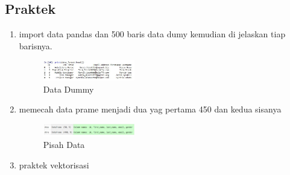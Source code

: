     \subsection{Praktek}
    \begin{enumerate}
        \item import data pandas dan 500 baris data dumy kemudian di jelaskan tiap barisnya. 
\hfill \break 
        
        \begin{figure}[H]
            \includegraphics[width=4cm]{figures/1174003/4/1.jpg}
            \centering
            \caption{Data Dummy}
        \end{figure}

        \item memecah data prame menjadi dua yag pertama 450 dan kedua sisanya \hfill \break 
        
        \begin{figure}[H]
            \includegraphics[width=4cm]{figures/1174003/4/2.jpg}
            \centering
            \caption{Pisah Data}
        \end{figure}

        \item praktek vektorisasi \hfill \break 
        

\end{enumerate}
